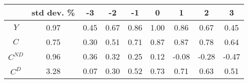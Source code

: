 \begin{tabular}{ccccccccc}
\toprule
 & std dev. \% & -3 & -2 & -1 & 0 & 1 & 2 & 3 \\
\midrule
$Y$ & 0.97 & 0.45 & 0.67 & 0.86 & 1.00 & 0.86 & 0.67 & 0.45 \\
$C$ & 0.75 & 0.30 & 0.51 & 0.71 & 0.87 & 0.87 & 0.78 & 0.64 \\
$C^{ND}$ & 0.96 & 0.36 & 0.32 & 0.25 & 0.12 & -0.08 & -0.28 & -0.47 \\
$C^{D}$ & 3.28 & 0.07 & 0.30 & 0.52 & 0.73 & 0.71 & 0.63 & 0.51 \\
\bottomrule
\end{tabular}
